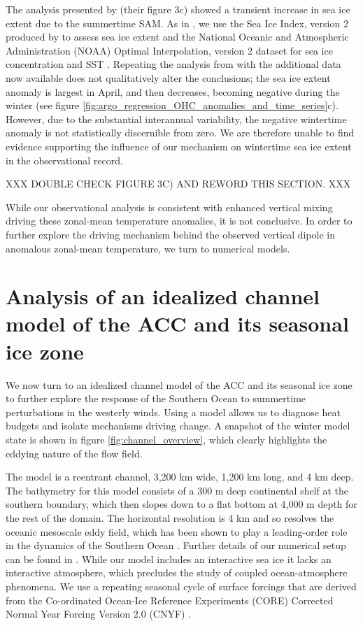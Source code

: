 \documentclass{ametsocV5}
\begin{document}
The analysis presented by \citet{Doddridge2017} (their figure 3c) showed a transient increase in sea ice extent due to the summertime SAM. As in \citet{Doddridge2017}, we use the Sea Ice Index, version 2 produced by \citet{Fetterer2016} to assess sea ice extent and the National Oceanic and Atmospheric Administration (NOAA) Optimal Interpolation, version 2 dataset for sea ice concentration and SST \citep{Reynolds2002}. Repeating the analysis from \citet{Doddridge2017} with the additional data now available does not qualitatively alter the conclusions; the sea ice extent anomaly is largest in April, and then decreases, becoming negative during the winter (see figure \ref{fig:argo_regression_OHC_anomalies_and_time_series}c). However, due to the substantial interannual variability, the negative wintertime anomaly is not statistically discernible from zero. We are therefore unable to find evidence supporting the influence of our mechanism on wintertime sea ice extent in the observational record.

XXX DOUBLE CHECK FIGURE 3C) AND REWORD THIS SECTION. XXX

While our observational analysis is consistent with enhanced vertical mixing driving these zonal-mean temperature anomalies, it is not conclusive. In order to further explore the driving mechanism behind the observed vertical dipole in anomalous zonal-mean temperature, we turn to numerical models.




\section{Analysis of an idealized channel model of the ACC and its seasonal ice zone} %
\label{sec:analysis_of_an_idealised_channel_model}

We now turn to an idealized channel model of the ACC and its seasonal ice zone to further explore the response of the Southern Ocean to summertime perturbations in the westerly winds. Using a model allows us to diagnose heat budgets and isolate mechanisms driving change.  A snapshot of the winter model state is shown in figure \ref{fig:channel_overview}, which clearly highlights the eddying nature of the flow field.

The model is a reentrant channel, 3,200 km wide, 1,200 km long, and 4 km deep. The bathymetry for this model consists of a 300 m deep continental shelf at the southern boundary, which then slopes down to a flat bottom at 4,000 m depth for the rest of the domain. The horizontal resolution is 4 km and so resolves the oceanic mesoscale eddy field, which has been shown to play a leading-order role in the dynamics of the Southern Ocean \citep[see e.g.][]{Marshall2003,Marshall2012b,Munday2013}. Further details of our numerical setup can be found in \citet{Doddridge2019a}. While our model includes an interactive sea ice \citep{Losch2010} it lacks an interactive atmosphere, which precludes the study of coupled ocean-atmosphere phenomena. We use a repeating seasonal cycle of surface forcings that are derived from the Co-ordinated Ocean-Ice Reference Experiments (CORE) Corrected Normal Year Forcing Version 2.0 (CNYF) \citep{Large2004}.
\end{document}
